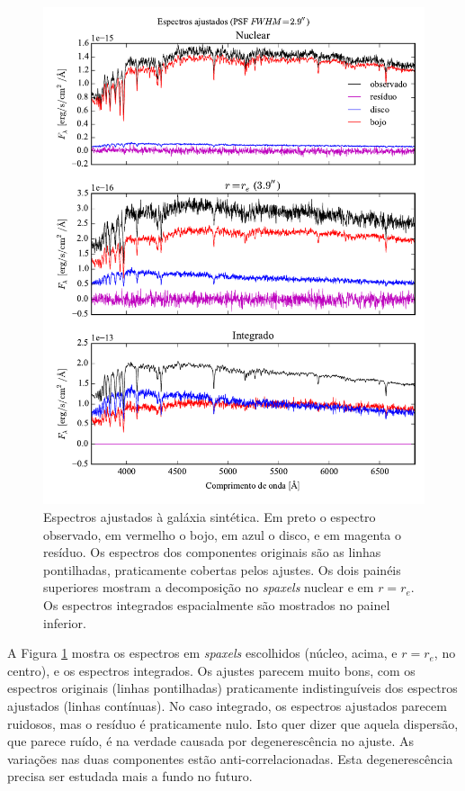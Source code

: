 \begin{figure}
	\includegraphics{figuras/simulation_spectra}
	\caption[Espectros ajustados à galáxia sintética.]
	{Espectros ajustados à galáxia sintética. Em preto o espectro observado, em
	vermelho o bojo, em azul o disco, e em magenta o resíduo. Os
	espectros dos componentes originais são as linhas pontilhadas, praticamente
	cobertas pelos ajustes. Os dois painéis superiores mostram a decomposição no
	{\em spaxels} nuclear e em $r=r_e$. Os espectros integrados espacialmente são
	mostrados no painel inferior.}
	\label{fig:testFitSpectra}
\end{figure}

A Figura \ref{fig:testFitSpectra} mostra os espectros em {\em spaxels}
escolhidos (núcleo, acima, e $r=r_e$, no centro), e os espectros integrados. Os
ajustes parecem muito bons, com os espectros originais (linhas pontilhadas)
praticamente indistinguíveis dos espectros ajustados (linhas contínuas). No caso
integrado, os espectros ajustados parecem ruidosos, mas o resíduo é praticamente
nulo. Isto quer dizer que aquela dispersão, que parece ruído, é na verdade
causada por degenerescência no ajuste. As variações nas duas componentes estão
anti-correlacionadas. Esta degenerescência precisa ser estudada mais a fundo no
futuro.

